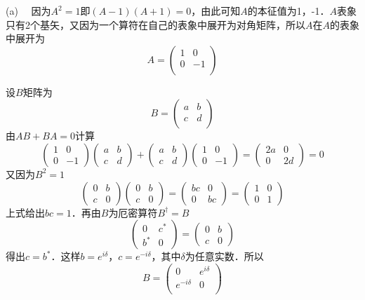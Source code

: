 (a) \ \ 因为$A^2=1$即$(A-1)(A+1)=0$，由此可知$A$的本征值为1，-1．$A$表象只有2个基矢，又因为一个算符在自己的表象中展开为对角矩阵，所以$A$在$A$的表象中展开为
$$
A=\left( \begin{matrix}
	1&		0\\
	0&		-1\\
\end{matrix} \right) 
$$

设$B$矩阵为
$$
B=\left( \begin{matrix}
	a&		b\\
	c&		d\\
\end{matrix} \right) 
$$
由$AB+BA=0$计算
$$
\left(\begin{array}{cc}
1 & 0 \\
0 & -1
\end{array}\right)\left(\begin{array}{ll}
a & b \\
c & d
\end{array}\right)+\left(\begin{array}{ll}
a & b \\
c & d
\end{array}\right)\left(\begin{array}{cc}
1 & 0 \\
0 & -1
\end{array}\right)=\left(\begin{array}{cc}
2 a & 0 \\
0 & 2 d
\end{array}\right)=0
$$
又因为$B^2=1$
$$
\left(\begin{array}{ll}
0 & b \\
c & 0
\end{array}\right)\left(\begin{array}{ll}
0 & b \\
c & 0
\end{array}\right)=\left(\begin{array}{ll}
b c & 0 \\
0 & b c
\end{array}\right)=\left(\begin{array}{ll}
1 & 0 \\
0 & 1
\end{array}\right)$$
上式给出$bc=1$．再由$B$为厄密算符$B^\dagger=B$
$$
\left(\begin{array}{ll}
0 & c^* \\
b^* & 0
\end{array}\right)=\left(\begin{array}{ll}
0 & b \\
c & 0
\end{array}\right)
$$
得出$c=b^*$．这样$b=e^{i\delta}$，$c=e^{-i\delta}$，其中$\delta$为任意实数．所以
$$
B=\left( \begin{matrix}
	0&		e^{i\delta}\\
	e^{-i\delta}&		0\\
\end{matrix} \right) 
$$

